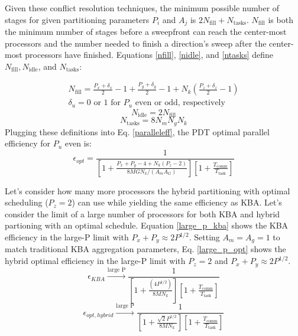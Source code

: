 Given these conflict resolution techniques, the minimum possible number of stages for given partitioning parameters $P_i$ and $A_j$ is $2N_{\text{fill}} + N_{\text{tasks}}$. $N_{\text{fill}}$ is both the minimum number of stages before a sweepfront can reach the center-most processors and the number needed to finish a direction's sweep after the center-most processors have finished. Equations \ref{nfill}, \ref{nidle}, and \ref{ntasks} define $N_{\text{fill}}, N_{\text{idle}}$, and $N_{\text{tasks}}$:

\begin{align}
N_\text{fill} = \frac{P_x + \delta_x}{2} - 1 + \frac{P_y + \delta_y}{2} - 1 + N_k (\frac{P_z + \delta_z}{2} - 1)\label{nfill} \\ 
\delta_u = 0 \text{ or } 1 \text{ for $P_u$ even or odd, respectively} \nonumber
\end{align}
\begin{equation}
N_\text{idle} = 2N_{\text{fill}}
\label{nidle}
\end{equation}
\begin{equation}
N_\text{tasks} = 8N_mN_gN_k
\label{ntasks}
\end{equation}
Plugging these definitions into Eq. \ref{paralleleff}, the PDT optimal parallel efficiency \cite{mpadams2013} for $P_u$ even is:
\begin{equation}
	\epsilon_{opt} = \frac{1}{ [1 + \frac{P_x + P_y - 4 + N_k(P_z -2)}{8MGN_k/(A_m A_G)} ]  [ 1 +  \frac{T_{\text{comm}}}{T_{\text{task}}} ]}
	\label{eps_opt}
\end{equation}

Let's consider how many more processors the hybrid partitioning with optimal scheduling ($P_z = 2$) can use while yielding the same efficiency as KBA.
Let's consider the limit of a large number of processors for both KBA and hybrid partioning with an optimal schedule.
Equation \ref{large_p_kba} shows the KBA efficiency in the large-P limit with $P_x + P_y \approx 2P^{1/2}$.
Setting $A_m = A_g = 1$ to match traditional KBA aggregation parameters, Eq. \ref{large_p_opt} shows the hybrid optimal efficiency in the large-P limit with $P_z = 2$ and $P_x + P_y \approx 2P^{1/2}$.  
\begin{equation}
  \epsilon_{KBA} \xrightarrow{\text{large P}} \frac{1}{[1 + \frac{(4P^{1/2})}{8MN_k}][ 1 +  \frac{T_{\text{comm}}}{T_{\text{task}}}]}
  \label{large_p_kba}
\end{equation}
\begin{equation}
  \epsilon_{opt,hybrid} \xrightarrow{\text{large P}} \frac{1}{[1 + \frac{\sqrt{2}P^{1/2}}{8MN_k}][ 1 +  \frac{T_{\text{comm}}}{T_{\text{task}}} ]}
  \label{large_p_opt}
\end{equation}

